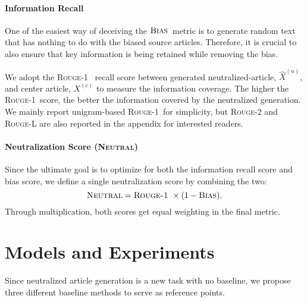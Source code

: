 \documentclass[11pt,a4paper]{article}
\newcommand{\rouge}{{\scshape Rouge-1}}
\newcommand{\all}{$\textsc{Bias}$}
\newcommand{\neutral}{\textsc{Neutral}}
\newcommand\yeon[1]{\textcolor{purple}{\textbf{}#1}}
\begin{document}

\paragraph{Information Recall} One of the easiest way of deceiving the \all~metric is to generate random text that has nothing to do with the biased source articles. Therefore, it is crucial to also ensure that key information is being retained while removing the bias.

We adopt the \rouge~\cite{lin2004rouge} recall score 
between generated neutralized-article, $\hat{X}^{(n)}$, and center article, $X^{(c)}$ to measure the information coverage. The higher the \rouge~score, the better the information covered by the neutralized generation. We mainly report unigram-based \rouge~for simplicity,
but {\scshape{Rouge-2}} and {\scshape{Rouge-L}} are also reported in the appendix for interested readers.

\paragraph{Neutralization Score (\neutral)}
Since the ultimate goal is to optimize for both the information recall score and bias score, we define a single neutralization score by combining the two: 
\begin{equation}
    \textsc{Neutral} = \textsc{\rouge}~\times (1 - \textsc{Bias}).
\end{equation}
Through multiplication, both scores get equal weighting in the final metric. 

\section{Models and Experiments}
\label{sec:experiment}
Since neutralized article generation is a new task with no baseline, we propose three different baseline methods to serve as reference points.
\end{document}
